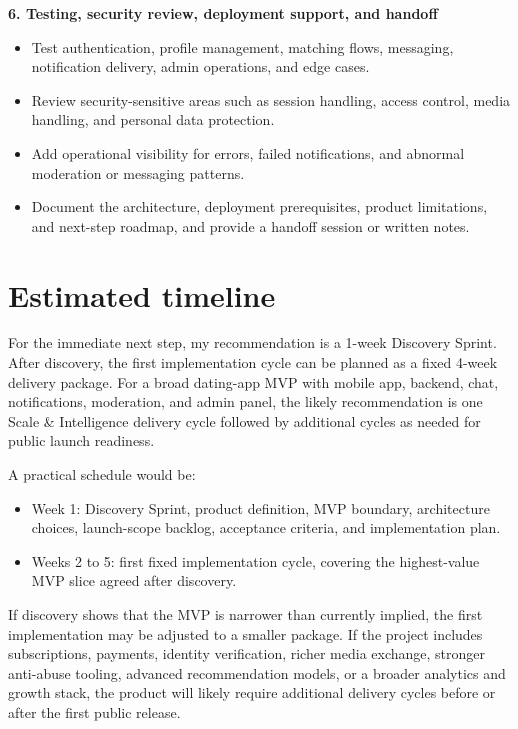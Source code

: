 \documentclass[11pt,a4paper]{article}
\begin{document}
\textbf{6. Testing, security review, deployment support, and handoff}\par

\begin{itemize}
\item Test authentication, profile management, matching flows, messaging, notification delivery, admin operations, and edge cases.
\item Review security-sensitive areas such as session handling, access control, media handling, and personal data protection.
\item Add operational visibility for errors, failed notifications, and abnormal moderation or messaging patterns.
\item Document the architecture, deployment prerequisites, product limitations, and next-step roadmap, and provide a handoff session or written notes.
\end{itemize}

\section*{Estimated timeline}

For the immediate next step, my recommendation is a 1-week Discovery Sprint. After discovery, the first implementation cycle can be planned as a fixed 4-week delivery package. For a broad dating-app MVP with mobile app, backend, chat, notifications, moderation, and admin panel, the likely recommendation is one Scale \& Intelligence delivery cycle followed by additional cycles as needed for public launch readiness.\par

A practical schedule would be:\par

\begin{itemize}
\item Week 1: Discovery Sprint, product definition, MVP boundary, architecture choices, launch-scope backlog, acceptance criteria, and implementation plan.
\item Weeks 2 to 5: first fixed implementation cycle, covering the highest-value MVP slice agreed after discovery.
\end{itemize}

If discovery shows that the MVP is narrower than currently implied, the first implementation may be adjusted to a smaller package. If the project includes subscriptions, payments, identity verification, richer media exchange, stronger anti-abuse tooling, advanced recommendation models, or a broader analytics and growth stack, the product will likely require additional delivery cycles before or after the first public release.\par
\end{document}
